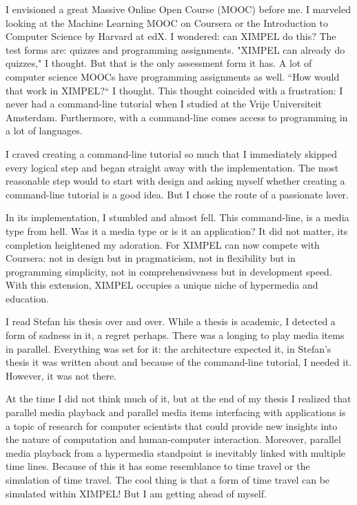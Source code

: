 I envisioned a great Massive Online Open Course (MOOC) before me. I marveled looking at the Machine Learning MOOC on Coursera or the Introduction to Computer Science by Harvard at edX. I wondered: can XIMPEL do this? The test forms are: quizzes and programming assignments. "XIMPEL can already do quizzes," I thought. But that is the only assessment form it has. A lot of computer science MOOCs have programming assignments as well. ``How would that work in XIMPEL?`` I thought. This thought coincided with a frustration: I never had a command-line tutorial when I studied at the Vrije Universiteit Amsterdam. Furthermore, with a command-line comes access to programming in a lot of languages.

I craved creating a command-line tutorial so much that I immediately skipped every logical step and began straight away with the implementation. The most reasonable step would to start with design and asking myself whether creating a command-line tutorial is a good idea. But I chose the route of a passionate lover.  

In its implementation, I stumbled and almost fell. This command-line, is a media type from hell. Was it a media type or is it an application? It did not matter, its completion heightened my adoration. For XIMPEL can now compete with Coursera: not in design but in pragmaticism, not in flexibility but in programming simplicity, not in comprehensiveness but in development speed. With this extension, XIMPEL occupies a unique niche of hypermedia and education.

I read Stefan his thesis over and over. While a thesis is academic, I detected a form of sadness in it, a regret perhaps. There was a longing to play media items in parallel. Everything was set for it: the architecture expected it, in Stefan's thesis it was written about and because of the command-line tutorial, I needed it. However, it was not there.

At the time I did not think much of it, but at the end of my thesis I realized that parallel media playback and parallel media items interfacing with applications is a topic of research for computer scientists that could provide new insights into the nature of computation and human-computer interaction. Moreover, parallel media playback from a hypermedia standpoint is inevitably linked with multiple time lines. Because of this it has some resemblance to time travel or the simulation of time travel. The cool thing is that a form of time travel can be simulated within XIMPEL! But I am getting ahead of myself.

